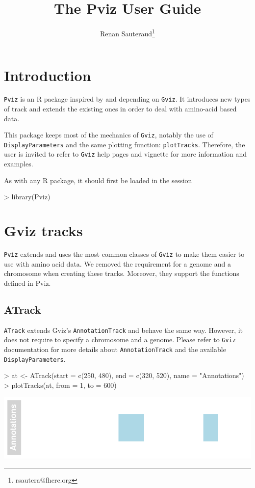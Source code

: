 \documentclass[11pt]{article}
\author{Renan Sauteraud\footnote{rsautera@fhcrc.org}}
\begin{document}
\title{The Pviz User Guide}
\maketitle

\tableofcontents


\section{Introduction}
\texttt{Pviz} is an R package inspired by and depending on \texttt{Gviz}. It
introduces new types of track and extends the existing ones in order to deal
with amino-acid based data.

This package keeps most of the mechanics of \texttt{Gviz}, notably the use of
\texttt{DisplayParameters} and the same plotting function: \texttt{plotTracks}.
Therefore, the user is invited to refer to \texttt{Gviz} help pages and vignette
for more information and examples.

As with any R package, it should first be loaded in the session
\begin{Schunk}
\begin{Sinput}
> library(Pviz)
\end{Sinput}
\end{Schunk}



\section{Gviz tracks}
\texttt{Pviz} extends and uses the most common classes of \texttt{Gviz} to make
them easier to use with amino acid data. We removed the requirement for a genome
and a chromosome when creating these tracks. Moreover, they support the
functions defined in Pviz.

\subsection{ATrack}
\texttt{ATrack} extends Gviz's \texttt{AnnotationTrack} and behave the same way.
However, it does not require to specify a chromosome and a genome. Please refer
to \texttt{Gviz} documentation for more details about \texttt{AnnotationTrack}
and the available \texttt{DisplayParameters}.
\begin{Schunk}
\begin{Sinput}
> at <- ATrack(start = c(250, 480), end = c(320, 520), name = "Annotations")
> plotTracks(at, from = 1, to = 600)
\end{Sinput}
\end{Schunk}
\includegraphics{Pviz-ATrack-example}
\end{document}
